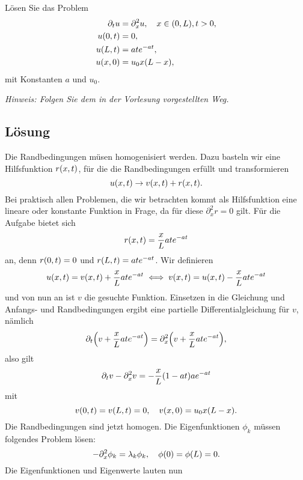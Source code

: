 \documentclass{exercise}
\begin{document}
    \begin{problem}
        Lösen Sie das Problem
        \begin{align*}
            \partial_t u &= \partial_x^2 u, \quad x \in \parentheses*{0, L}, t > 0,\\
            u\parentheses*{0, t} &= 0,\\
            u\parentheses*{L, t} &= ate^{-at},\\
            u\parentheses*{x, 0} &= u_0 x\parentheses*{L - x},
        \end{align*}
        mit Konstanten \(a\) und \(u_0\).

        \emph{Hinweis: Folgen Sie dem in der Vorlesung vorgestellten Weg.}
    \end{problem}
    
    \subsection*{Lösung}
    Die Randbedingungen müsen homogenisiert werden. Dazu basteln wir eine Hilfsfunktion \(r\parentheses*{x, t}\), für die die Randbedingungen erfüllt und transformieren
    \[
        u\parentheses*{x, t} \to v\parentheses*{x, t} + r\parentheses*{x, t}.
    \]
    Bei praktisch allen Problemen, die wir betrachten kommt als Hilfsfunktion eine lineare oder konstante Funktion in Frage, da für diese \(\partial_x^2 r = 0\) gilt.
    Für die Aufgabe bietet sich
    \[
        r\parentheses*{x, t} = \frac{x}{L}ate^{-at}
    \]
    an, denn \(r\parentheses*{0, t} = 0\) und \(r\parentheses*{L, t} = ate^{-at}\).
    Wir definieren
    \[
        u\parentheses*{x, t} = v\parentheses*{x, t} + \frac{x}{L}ate^{-at} \iff v\parentheses*{x, t} = u\parentheses*{x, t} - \frac{x}{L}ate^{-at}
    \]
    und von nun an ist \(v\) die gesuchte Funktion.
    Einsetzen in die Gleichung und Anfangs- und Randbedingungen ergibt eine partielle Differentialgleichung für \(v\), nämlich
    \[
        \partial_t\parentheses*{v + \frac{x}{L}ate^{-at}} = \partial_x^2\parentheses*{v + \frac{x}{L}ate^{-at}},
    \]
    also gilt
    \[
        \partial_t v - \partial_x^2 v = -\frac{x}{L}\parentheses*{1 - at}ae^{-at}
    \]
    mit
    \[
        v\parentheses*{0, t} = v\parentheses*{L, t} = 0, \quad v\parentheses*{x, 0} = u_0 x\parentheses*{L - x}.
    \]
    Die Randbedingungen sind jetzt homogen.
    Die Eigenfunktionen \(\phi_k\) müssen folgendes Problem lösen:
    \[
        -\partial_x^2 \phi_k = \lambda_k \phi_k, \quad \phi\parentheses*{0} = \phi\parentheses*{L} = 0.
    \]
    Die Eigenfunktionen und Eigenwerte lauten nun
\end{document}
